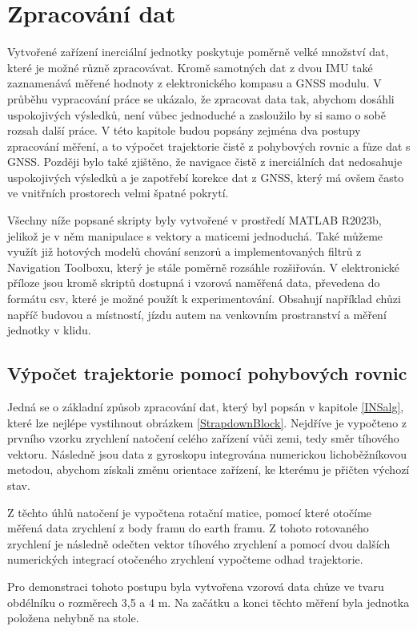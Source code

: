 \chapter{Zpracování dat}
Vytvořené zařízení inerciální jednotky poskytuje poměrně velké množství dat, které je možné různě zpracovávat. Kromě samotných dat z dvou IMU také zaznamenává měřené hodnoty z elektronického kompasu a GNSS modulu. V průběhu vypracování práce se ukázalo, že zpracovat data tak, abychom dosáhli uspokojivých výsledků, není vůbec jednoduché a zasloužilo by si samo o sobě rozsah další práce. V této kapitole budou popsány zejména dva postupy zpracování měření, a to výpočet trajektorie čistě z pohybových rovnic a fůze dat s GNSS. Později bylo také zjištěno, že navigace čistě z inerciálních dat nedosahuje uspokojivých výsledků a je zapotřebí korekce dat z GNSS, který má ovšem často ve vnitřních prostorech velmi špatné pokrytí.

Všechny níže popsané skripty byly vytvořené v prostředí MATLAB R2023b, jelikož je v něm manipulace s vektory a maticemi jednoduchá. Také můžeme využít již hotových modelů chování senzorů a implementovaných filtrů z Navigation Toolboxu, který je stále poměrně rozsáhle rozšiřován. V elektronické příloze jsou kromě skriptů dostupná i vzorová naměřená data, převedena do formátu csv, které je možné použít k experimentování. Obsahují například chůzi napříč budovou a místností, jízdu autem na venkovním prostranství a měření jednotky v klidu.

\section{Výpočet trajektorie pomocí pohybových rovnic} \label{noFiltProcessing}
Jedná se o základní způsob zpracování dat, který byl popsán v kapitole \ref{INSalg}, které lze nejlépe vystihnout obrázkem  \ref{StrapdownBlock}. Nejdříve je vypočteno z prvního vzorku zrychlení natočení celého zařízení vůči zemi, tedy směr tíhového vektoru. Následně jsou data z gyroskopu integrována numerickou lichoběžníkovou metodou, abychom získali změnu orientace zařízení, ke kterému je přičten výchozí stav.

Z těchto úhlů natočení je vypočtena rotační matice, pomocí které otočíme měřená data zrychlení z body framu do earth framu. Z tohoto rotovaného zrychlení je následně odečten vektor tíhového zrychlení a pomocí dvou dalších numerických integrací otočeného zrychlení vypočteme odhad trajektorie.

Pro demonstraci tohoto postupu byla vytvořena vzorová data chůze ve tvaru obdélníku o rozměrech 3,5 a 4 m. Na začátku a konci těchto měření byla jednotka položena nehybně na stole.

